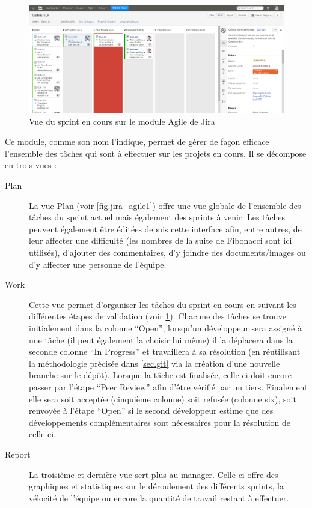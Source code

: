 \documentclass[12pt,a4paper]{book}
\begin{document}
\begin{figure}[htp]
\centering
\includegraphics[scale=.30]{img/jira_agile_2.png}
 \caption{Vue du sprint en cours sur le module Agile de Jira}
 \label{fig.jira_agile2}
\end{figure}

Ce module, comme son nom l'indique, permet de gérer de façon efficace l'ensemble des tâches qui sont à effectuer sur les projets en cours. Il se décompose en trois vues :

\begin{description}
  \item[Plan] La vue Plan (voir \cref{fig.jira_agile1}) offre une vue globale de l'ensemble des tâches du sprint actuel mais également des sprints à venir. Les tâches peuvent également être éditées depuis cette interface afin, entre autres, de leur affecter une difficulté (les nombres de la suite de Fibonacci sont ici utilisés), d'ajouter des commentaires, d'y joindre des documents/images ou d'y affecter une personne de l'équipe.
  \item[Work] Cette vue permet d'organiser les tâches du sprint en cours en suivant les différentes étapes de validation (voir \cref{fig.jira_agile2}). Chacune des tâches se trouve initialement dans la colonne ``Open'', lorsqu'un développeur sera assigné à une tâche (il peut également la choisir lui même) il la déplacera dans la seconde colonne ``In Progress'' et travaillera à sa résolution (en réutilisant la méthodologie précisée dans \cref{sec.git} via la création d'une nouvelle branche sur le dépôt). Lorsque la tâche est finalisée, celle-ci doit encore passer par l'étape ``Peer Review'' afin d'être vérifié par un tiers. Finalement elle sera soit acceptée (cinquième colonne) soit refusée (colonne six), soit renvoyée à l'étape ``Open'' si le second développeur estime que des développements complémentaires sont nécessaires pour la résolution de celle-ci.
  \item[Report] La troisième et dernière vue sert plus au manager. Celle-ci offre des graphiques et statistiques sur le déroulement des différents sprints, la vélocité de l'équipe ou encore la quantité de travail restant à effectuer.
\end{description}
\end{document}
